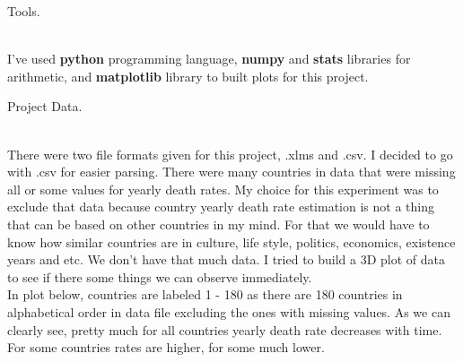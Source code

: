 \documentclass[12pt, letterpaper]{article}
\begin{document}
\begin{enumerate}[label=\Roman*.]

	{\bf \item Tools.}\\
	
	I've used {\bf python} programming language, {\bf numpy} and  {\bf stats} libraries for arithmetic, and {\bf matplotlib} library to built plots for this project.\\
	
	{\bf \item Project Data.} \\
	
	There were two file formats given for this project, .xlms and .csv. I decided to go with .csv for easier parsing. There were many countries in data that were missing all or some values for yearly death rates. My choice for this experiment was to exclude that data because country yearly death rate estimation is not a thing that can be based on other countries in my mind. For that we would have to know how similar countries are in culture, life style, politics, economics,  existence  years and etc. We don't have that much data. I tried to build a 3D plot of data to see if there some things we can observe immediately. \\
	In plot below, countries are labeled 1 - 180 as there are 180 countries in alphabetical order in data file excluding the ones with missing values. As we can clearly see, pretty much for all countries yearly death rate decreases with time. For some countries rates are higher, for some much lower. \\
	

\end{enumerate}
\end{document}
